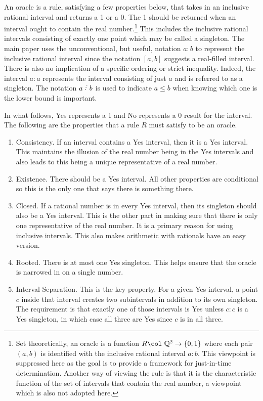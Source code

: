 \documentclass[12pt]{article}
\begin{document}
An oracle is a rule, satisfying a few properties below, that takes in an inclusive rational interval and returns a 1 or a 0. The 1 should be returned when an interval ought to contain the real number.\footnote{Set theoretically, an oracle is a function $R \col \ \mathbb{Q}^2 \to \{0,1\}$ where each pair $(a,b)$ is identified with the inclusive rational interval $a:b$. This viewpoint is suppressed here as the goal is to provide a framework for just-in-time determination. Another way of viewing the rule is that it is the characteristic function of the set of intervals that contain the real number, a viewpoint which is also not adopted here.} This includes the inclusive rational intervals consisting of exactly one point which may be called a singleton. The main paper uses the unconventional, but useful, notation $a:b$ to represent the inclusive rational interval since the notation $[a,b]$ suggests a real-filled interval. There is also no implication of a specific ordering or strict inequality.  Indeed, the  interval $a:a$ represents the interval consisting of just $a$ and is referred to as a singleton. The notation $a\lte b$ is used to indicate $a\leq b$ when knowing which one is the lower bound is important. 

In what follows, Yes represents a 1 and No represents a 0 result for the interval. The following are the properties that a rule $R$ must satisfy to be an oracle. 

\begin{enumerate}
    \item Consistency. If an interval contains a Yes interval, then it is a Yes interval. This maintains the illusion of the real number being in the Yes intervals and also leads to this being a unique representative of a real number. 
    \item Existence. There should be a Yes interval. All other properties are conditional so this is the only one that says there is something there. 
    \item Closed. If a rational number is in every Yes interval, then its singleton should also be a Yes interval. This is the other part in making sure that there is only one representative of the real number. It is a primary reason for using inclusive intervals. This also makes arithmetic with rationals have an easy version.
    \item Rooted. There is at most one Yes singleton.  This helps ensure that the oracle is narrowed in on a single number. 
    \item Interval Separation. This is the key property. For a given Yes interval, a point $c$ inside that interval creates two subintervals in addition to its own singleton. The requirement is that exactly one of those intervals is Yes unless $c:c$ is a Yes singleton, in which case all three are Yes since $c$ is in all three.  
\end{enumerate}
\end{document}
